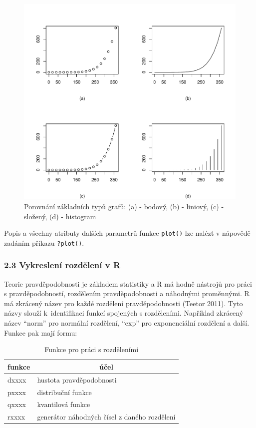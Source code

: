 \documentclass[12pt,]{article}
\begin{document}
\begin{figure}[H]

{\centering \includegraphics[width=0.8\linewidth]{BP_files/figure-latex/graf_typy-1} 

}

\caption{\label{fig:ch2.1} Porovnání základních typů grafů: (a) - bodový, (b) - liniový, (c) - složený, (d) - histogram}\label{fig:graf_typy}
\end{figure}

Popis a všechny atributy dalších parametrů funkce \texttt{plot()} lze
nalézt v nápovědě zadáním příkazu \texttt{?plot()}.

\hypertarget{distribution}{\subsubsection{2.3 Vykreslení rozdělení v
R}\label{distribution}}

\qquad Teorie pravděpodobnosti je základem statistiky a R má hodně
nástrojů pro práci s pravděpodobností, rozdělením pravděpodobnosti a
náhodnými proměnnými. R má zkrácený název pro každé rozdělení
pravděpodobnosti (Teetor 2011). Tyto názvy slouží k~identifikaci funkcí
spojených s rozděleními. Například zkrácený název \enquote{norm} pro
normální rozdělení, \enquote{exp} pro exponenciální rozdělení a další.
Funkce pak mají formu:

\begin{table}[H]
\centering
\begin{tabular}{|l|l|}
\hline
funkce & \multicolumn{1}{c|}{účel}                    \\ \hline
dxxxx  & hustota pravděpodobnosti                     \\ \hline
pxxxx  & distribuční funkce                           \\ \hline
qxxxx  & kvantilová funkce                            \\ \hline
rxxxx  & generátor náhodných čísel z daného rozdělení \\ \hline
\end{tabular}
\caption{Funkce pro práci s rozděleními}
\label{tab2}
\end{table}
\end{document}
